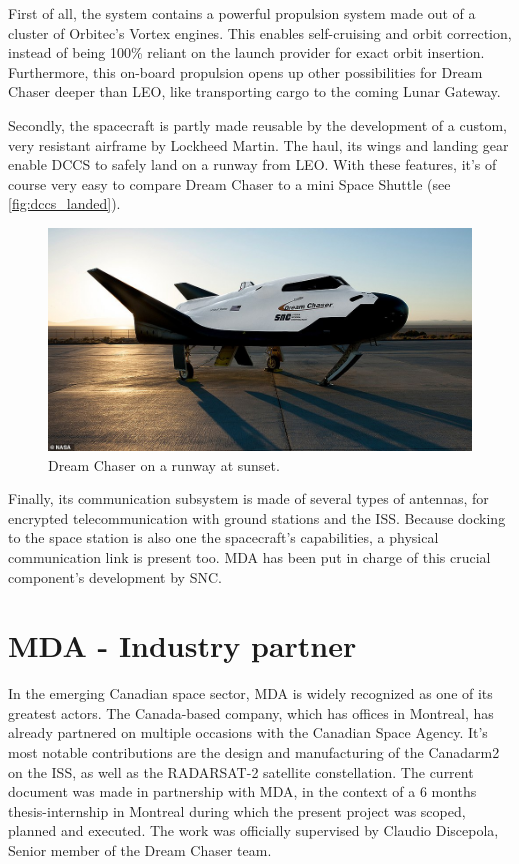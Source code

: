 {First of all, the system contains a powerful propulsion system made out of a cluster of Orbitec's Vortex engines\cite{online:messier}. This enables self-cruising and orbit correction, instead of being 100\% reliant on the launch provider for exact orbit insertion. Furthermore, this on-board propulsion opens up other possibilities for Dream Chaser deeper than \gls{LEO}, like transporting cargo to the coming Lunar Gateway. 

Secondly, the  spacecraft is partly made reusable by the development of a custom, very resistant airframe by Lockheed Martin. The haul, its wings and landing gear enable \gls{DCCS} to safely land on a runway from \gls{LEO}. With these features, it's of course very easy to compare Dream Chaser to a mini Space Shuttle (see \autoref{fig:dccs_landed}). 
\begin{figure}[H]
	\centering
	\includegraphics[width=0.9\linewidth, keepaspectratio]{art/dream_chaser_landed.jpg}
	\caption{Dream Chaser on a runway at sunset.}
	\label{fig:dccs_landed}
\end{figure}
Finally, its communication subsystem is made of several types of antennas, for encrypted telecommunication with ground stations and the \gls{ISS}. Because docking to the space station is also one the spacecraft's capabilities, a physical communication link is present too. \gls{MDA} has been put in charge of this crucial component's development by \gls{SNC}. 

\section{MDA - Industry partner}
In the emerging Canadian space sector, \gls{MDA} is widely recognized as one of its greatest actors. The Canada-based company, which has offices in Montreal, has already partnered on multiple occasions with the Canadian Space Agency. It's most notable contributions are the design and manufacturing of the Canadarm2 on the \gls{ISS}, as well as the RADARSAT-2 satellite constellation. The current document was made in partnership with \gls{MDA}, in the context of a 6 months thesis-internship in Montreal during which the present project was scoped, planned and executed. The work was officially supervised by Claudio Discepola, Senior member of the Dream Chaser team. 

}
